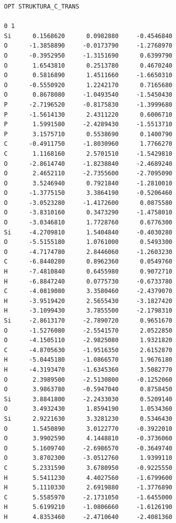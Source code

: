 \documentclass[
digital, %
table,   %
nolof,     %
nolot,     %
oneside,
]{fithesis3}
\begin{document}
\begin{lstlisting}[frame=single, caption={puvodni struktura C trans },label=DescriptiveLabel]
OPT STRUKTURA_C_TRANS

0 1
Si      0.1568620      0.0982880     -0.4546840
O      -1.3858890     -0.0173790     -1.2768970
O      -0.3952950     -1.3151690      0.6399790
O       1.6543810      0.2513780      0.4670240
O       0.5816890      1.4511660     -1.6650310
O      -0.5550920      1.2242170      0.7165680
O       0.8678080     -1.0493540     -1.5450430
P      -2.7196520     -0.8175830     -1.3999680
P      -1.5614130      2.4311220      0.6006710
P       1.5991580     -2.4289430     -1.5513710
P       3.1575710      0.5538690      0.1400790
C      -0.4911750     -1.8030960      1.7766270
C       1.1168160      2.5701510     -1.5429810
O      -2.8614740     -1.8238840     -2.4689240
O       2.4652110     -2.7355600     -2.7095090
O       3.5246940      0.7921840     -1.2810010
O      -1.3775150      3.3864190     -0.5206460
O      -3.0523280     -1.4172600      0.0875580
O      -3.8310160      0.3473290     -1.4758010
O      -3.0346810      1.7728760      0.6776300
Si     -4.2709810      1.5404840     -0.4030280
O      -5.5155180      1.0761000      0.5493300
O      -4.7174780      2.8446060     -1.2603230
C      -6.8440280      0.8962360      0.0549760
H      -7.4810840      0.6455980      0.9072710
H      -6.8847240      0.0775730     -0.6733780
C      -4.0819080      3.3580460     -2.4379070
H      -3.9519420      2.5655430     -3.1827420
H      -3.1099430      3.7855500     -2.1798310
Si     -2.8613170     -2.7890720      0.9651670
O      -1.5276080     -2.5541570      2.0522850
O      -4.1505110     -2.9825080      1.9321820
C      -4.8705630     -1.9516350      2.6152870
H      -5.0445180     -1.0866570      1.9676180
H      -4.3193470     -1.6345360      3.5082770
O       2.3989500     -2.5130800     -0.1252060
O       3.9863780     -0.5947040      0.8758450
Si      3.8841800     -2.2433030      0.5209140
O       3.4932430      1.8594190      1.0534360
Si      2.9221630      3.3281230      0.5346430
O       1.5450890      3.0122770     -0.3922010
O       3.9902590      4.1448810     -0.3736060
O       5.1609740     -2.6986570     -0.3649740
O       3.8702300     -3.0512760      1.9399110
C       5.2331590      3.6780950     -0.9225550
H       5.5411230      4.4027560     -1.6799600
H       5.1110330      2.6919880     -1.3776890
C       5.5585970     -2.1731050     -1.6455000
H       5.6199210     -1.0806660     -1.6126190
H       4.8353460     -2.4710640     -2.4081360

\end{lstlisting}
\end{document}
